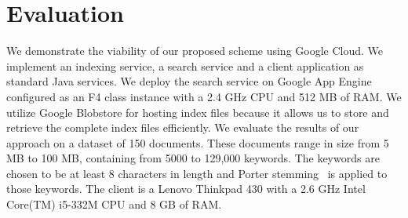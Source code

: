\section{Evaluation}
\label{sec:eval}

We demonstrate the viability of our proposed scheme using Google Cloud.
We implement an indexing service, a search service and a
client application as standard Java services. We deploy the search service 
on Google App Engine configured as an F4 class instance with a 2.4 GHz CPU and 512
MB of RAM. We utilize Google Blobstore for hosting index files because
it allows us to store and retrieve the complete index files efficiently.
We evaluate the results of our approach on a dataset of 150 documents. 
These documents range in size from 5 MB to 100 MB, containing from 5000 to
129,000 keywords. The keywords are chosen to be at least 8 characters in
length and Porter stemming~\cite{porter} is applied to those keywords.
The client is a Lenovo Thinkpad 430 with a 2.6 GHz Intel Core(TM) i5-332M
CPU and 8 GB of RAM.

%
%

